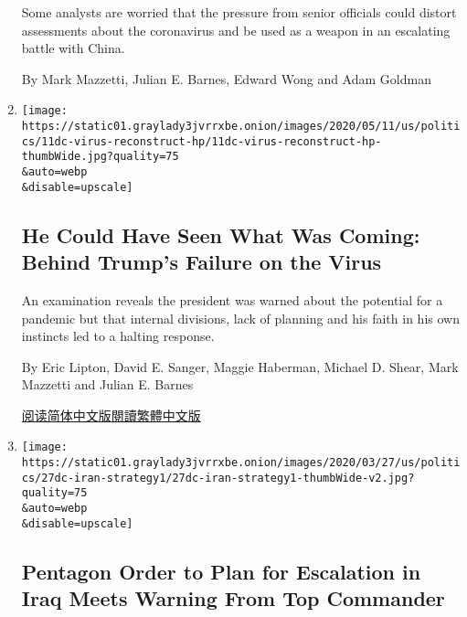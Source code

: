 \begin{enumerate}
  Some analysts are worried that the pressure from senior officials
  could distort assessments about the coronavirus and be used as a
  weapon in an escalating battle with China.

  By Mark Mazzetti, Julian E. Barnes, Edward Wong and Adam Goldman
\item
  \href{/2020/04/11/us/politics/coronavirus-trump-response.html}{}

  \texttt{[image: https://static01.graylady3jvrrxbe.onion/images/2020/05/11/us/politics/11dc-virus-reconstruct-hp/11dc-virus-reconstruct-hp-thumbWide.jpg?quality=75\\\&auto=webp\\\&disable=upscale]}

  \hypertarget{he-could-have-seen-what-was-coming-behind-trumps-failure-on-the-virus}{%
  \subsection{He Could Have Seen What Was Coming: Behind Trump's Failure
  on the
  Virus}\label{he-could-have-seen-what-was-coming-behind-trumps-failure-on-the-virus}}

  An examination reveals the president was warned about the potential
  for a pandemic but that internal divisions, lack of planning and his
  faith in his own instincts led to a halting response.

  By Eric Lipton, David E. Sanger, Maggie Haberman, Michael D. Shear,
  Mark Mazzetti and Julian E. Barnes

  \href{https://cn.nytimes3xbfgragh.onion/usa/20200413/coronavirus-trump-response/}{阅读简体中文版}\href{https://cn.nytimes3xbfgragh.onion/usa/20200413/coronavirus-trump-response/zh-hant/}{閱讀繁體中文版}
\item
  \href{/2020/03/27/world/middleeast/pentagon-iran-iraq-militias-coronavirus.html}{}

  \texttt{[image: https://static01.graylady3jvrrxbe.onion/images/2020/03/27/us/politics/27dc-iran-strategy1/27dc-iran-strategy1-thumbWide-v2.jpg?quality=75\\\&auto=webp\\\&disable=upscale]}

  \hypertarget{pentagon-order-to-plan-for-escalation-in-iraq-meets-warning-from-top-commander}{%
  \subsection{Pentagon Order to Plan for Escalation in Iraq Meets
  Warning From Top
  Commander}\label{pentagon-order-to-plan-for-escalation-in-iraq-meets-warning-from-top-commander}}


\end{enumerate}
